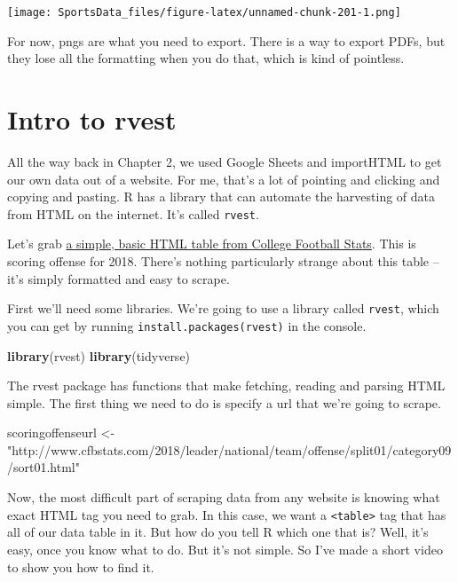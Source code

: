 \documentclass[]{book}
\newenvironment{Shaded}{\begin{snugshade}}{\end{snugshade}}
\newcommand{\KeywordTok}[1]{\textcolor[rgb]{0.13,0.29,0.53}{\textbf{#1}}}
\newcommand{\StringTok}[1]{\textcolor[rgb]{0.31,0.60,0.02}{#1}}
\newcommand{\NormalTok}[1]{#1}
\begin{document}
\texttt{[image: SportsData\_files/figure-latex/unnamed-chunk-201-1.png]}

For now, pngs are what you need to export. There is a way to export
PDFs, but they lose all the formatting when you do that, which is kind
of pointless.

\chapter{Intro to rvest}\label{intro-to-rvest}

All the way back in Chapter 2, we used Google Sheets and importHTML to
get our own data out of a website. For me, that's a lot of pointing and
clicking and copying and pasting. R has a library that can automate the
harvesting of data from HTML on the internet. It's called
\texttt{rvest}.

Let's grab
\href{http://www.cfbstats.com/2018/leader/national/team/offense/split01/category09/sort01.html}{a
simple, basic HTML table from College Football Stats}. This is scoring
offense for 2018. There's nothing particularly strange about this table
-- it's simply formatted and easy to scrape.

First we'll need some libraries. We're going to use a library called
\texttt{rvest}, which you can get by running
\texttt{install.packages(\textquotesingle{}rvest\textquotesingle{})} in
the console.

\begin{Shaded}
\begin{Highlighting}[]
\KeywordTok{library}\NormalTok{(rvest)}
\KeywordTok{library}\NormalTok{(tidyverse)}
\end{Highlighting}
\end{Shaded}

The rvest package has functions that make fetching, reading and parsing
HTML simple. The first thing we need to do is specify a url that we're
going to scrape.

\begin{Shaded}
\begin{Highlighting}[]
\NormalTok{scoringoffenseurl <-}\StringTok{ "http://www.cfbstats.com/2018/leader/national/team/offense/split01/category09/sort01.html"}
\end{Highlighting}
\end{Shaded}

Now, the most difficult part of scraping data from any website is
knowing what exact HTML tag you need to grab. In this case, we want a
\texttt{\textless{}table\textgreater{}} tag that has all of our data
table in it. But how do you tell R which one that is? Well, it's easy,
once you know what to do. But it's not simple. So I've made a short
video to show you how to find it.
\end{document}
